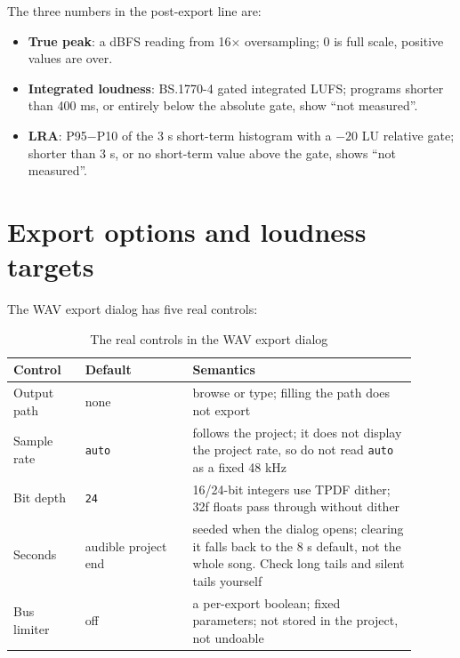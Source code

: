 
The three numbers in the post-export line are:

\begin{itemize}
  \item \textbf{True peak}: a dBFS reading from 16$\times$ oversampling; 0 is full scale, positive values are over.
  \item \textbf{Integrated loudness}: BS.1770-4 gated integrated LUFS; programs shorter than 400 ms, or entirely below the absolute gate, show ``not measured''.
  \item \textbf{LRA}: P95$-$P10 of the 3 s short-term histogram with a $-20$ LU relative gate; shorter than 3 s, or no short-term value above the gate, shows ``not measured''.
\end{itemize}

\section{Export options and loudness targets}

The WAV export dialog has five real controls:

\begin{table}[htbp]
\centering
\small
\begin{tabular}{@{}p{0.16\linewidth}p{0.24\linewidth}p{0.50\linewidth}@{}}
\hline
Control & Default & Semantics \\
\hline
Output path & none & browse or type; filling the path does not export \\
Sample rate & \texttt{auto} & follows the project; it does not display the project rate, so do not read \texttt{auto} as a fixed 48 kHz \\
Bit depth & \texttt{24} & 16/24-bit integers use TPDF dither; 32f floats pass through without dither \\
Seconds & audible project end & seeded when the dialog opens; clearing it falls back to the 8 s default, not the whole song. Check long tails and silent tails yourself \\
Bus limiter & off & a per-export boolean; fixed parameters; not stored in the project, not undoable \\
\hline
\end{tabular}
\caption{The real controls in the WAV export dialog}
\label{tab:export-options}
\end{table}

